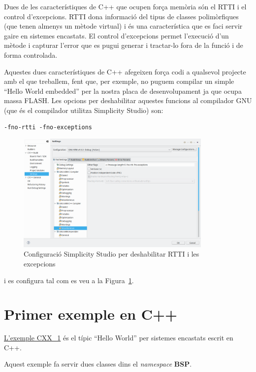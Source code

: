 Dues de les característiques de C++ que ocupen força memòria són el \gls{RTTI} i el control d'excepcions. RTTI dona informació del tipus de classes polimòrfiques (que tenen almenys un mètode virtual) i és una característica que es faci servir gaire en sistemes encastats. El control d'excepcions permet l'execució d'un mètode i capturar l'error que es pugui generar i tractar-lo fora de la funció i de forma controlada.

Aquestes dues característiques de C++ afegeixen força codi a qualsevol projecte amb el que treballem, fent que, per exemple, no puguem compilar un simple ``Hello World embedded'' per la nostra placa de desenvolupament ja que ocupa massa FLASH. Les opcions per deshabilitar aquestes funcions al compilador GNU (que és el compilador utilitza Simplicity Studio) son:
\begin{verbatim}
-fno-rtti -fno-exceptions
\end{verbatim}

\begin{figure}
 \centering
\includegraphics[width=0.85\textwidth, keepaspectratio]{imatges/CXX_options.png}
 \caption{Configuració Simplicity Studio per deshabilitar RTTI i les excepcions}
 \label{fig:CXX_RTT}
\end{figure}
i es configura tal com es veu a la Figura~\ref{fig:CXX_RTT}.

\section{Primer exemple en C++}
\label{sec:CXX_example}
\href{https://github.com/mariusmm/cursembedded/tree/master/Simplicity/CXX_1}{L'exemple CXX\_1} és el típic ``Hello World'' per sistemes encastats escrit en C++.

Aquest exemple fa servir dues classes dins el {\em namespace} {\bf BSP}.

